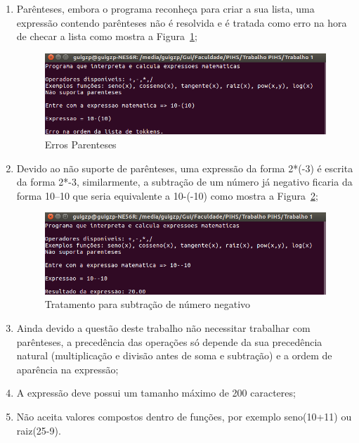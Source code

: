 \documentclass[12pt]{article}
\begin{document}
\begin{enumerate}
\item Parênteses, embora o programa reconheça para criar a sua lista, uma expressão contendo parênteses não é resolvida e é tratada como erro na hora de checar a lista como mostra a Figura~\ref{fig:erro_parenteses};

\begin{figure}[H]
\centering
\includegraphics[width=\textwidth]{Imagens/erro_parenteses.png}
\caption{Erros Parenteses}
\label{fig:erro_parenteses}
\end{figure}

\item Devido ao não suporte de parênteses, uma expressão da forma 2*(-3) é escrita da forma 2*-3, similarmente, a subtração de um número já negativo ficaria da forma 10--10 que seria equivalente a 10-(-10) como mostra a Figura~\ref{fig:menos};

\begin{figure}[H]
\centering
\includegraphics[width=\textwidth]{Imagens/dois_menos.png}
\caption{Tratamento para subtração de número negativo}
\label{fig:menos}
\end{figure}

\item Ainda devido a questão deste trabalho não necessitar trabalhar com parênteses, a precedência das operações só depende da sua precedência natural (multiplicação e divisão antes de soma e subtração) e a ordem de aparência na expressão;

\item A expressão deve possui um tamanho máximo de 200 caracteres;

\item Não aceita valores compostos dentro de funções, por exemplo seno(10+11) ou raiz(25-9).
\end{enumerate}
\end{document}
